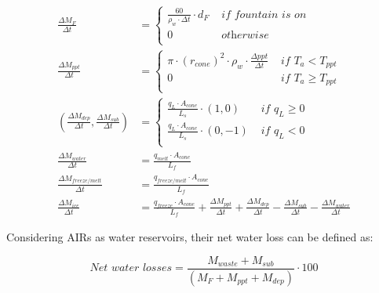 \documentclass[utf8]{frontiersSCNS}
\begin{document}
\begin{subequations}
	\begin{align}
		\frac{\Delta M_{F}}{\Delta t} & = \left\{ \begin{array}{ll} \frac{60}{\rho_w \cdot \Delta t} \cdot d_F
			 & \textit{ if fountain is on} \\ 0 & \textit{ otherwise } \\\end{array} \right.                                             \\
		\label{eq:ppt}
		\frac{\Delta M_{ppt}}{\Delta t}                                    & = \left\{ \begin{array}{ll} \pi \cdot
        {(r_{cone})}^2 \cdot
			\rho_{w}\cdot \frac {\Delta ppt}{\Delta t} & \textit{ if } T_{a} < T_{ppt} \\ 0 & \textit{ if } T_{a} \geq T_{ppt} \\\end{array} \right.                                             \\
		\label{eq:vap}
		(\frac{\Delta M_{dep}}{\Delta t}, \frac{\Delta M_{sub}}{\Delta t}) & = \left\{ \begin{array}{ll} \frac{q_{L}
			\cdot A_{cone}}{L_s}\cdot (1,0)  & \textit{ if } q_{L} \geq 0 \\ \frac{q_{L}
			\cdot A_{cone}}{L_s}\cdot (0,-1) & \textit{ if } q_{L} < 0    \\\end{array} \right.                                             \\
		\label{eq:mwat}
		\frac{\Delta M_{water}}{\Delta t}                                  & = \frac{q_{melt} \cdot A_{cone} }{L_f}                                                   \\
	  \label{eq:m_freeze/melt}
    \frac{\Delta M_{freeze/melt}}{\Delta t} & = \frac{q_{freeze/melt} \cdot A_{cone} }{L_f} \\
		\label{eq:mcone}
		\frac{\Delta M_{ice}}{\Delta t}                                    & = \frac{q_{freeze}\cdot A_{cone} }{L_f} + \frac{\Delta M_{ppt}}{\Delta t} + \frac{\Delta
			M_{dep}}{\Delta t}- \frac{\Delta M_{sub}}{\Delta t}- \frac{\Delta M_{water}}{\Delta t}
	\end{align}
\end{subequations}

Considering AIRs as water reservoirs, their net water loss can be defined as:

\begin{equation} \textit{Net water losses} = \frac{M_{waste}+M_{sub}}{(M_F+M_{ppt}+M_{dep})} \cdot 100 \end{equation}
\end{document}
